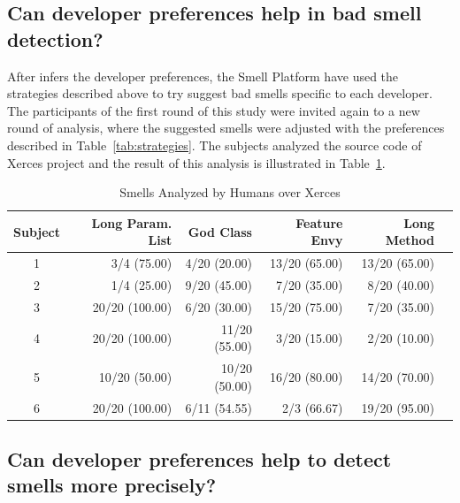 \documentclass[conference]{IEEEtran}
\begin{document}
\subsection{Can developer preferences help in bad smell detection?}

After infers the developer preferences, the Smell Platform have used the strategies described above to try suggest bad smells specific to each developer. The participants of the first round of this study were invited again to a new round of analysis, where the suggested smells were adjusted with the preferences described in Table~\ref{tab:strategies}. The subjects analyzed the source code of Xerces project and the result of this analysis is illustrated in Table~\ref{tab:turn2}.

\begin{table}[h]
\centering
\caption{Smells Analyzed by Humans over Xerces}
\label{tab:turn2}
\begin{tabular}{crrrrr}
\hline
Subject & \multicolumn{1}{r}{Long Param. List}       & \multicolumn{1}{r}{God Class}          & \multicolumn{1}{r}{Feature Envy}           & \multicolumn{1}{r}{Long Method}  \\ \hline
1   & \multicolumn{1}{r}{3/4 (75.00)} & \multicolumn{1}{r}{4/20 (20.00)} & \multicolumn{1}{r}{13/20 (65.00)} & 13/20 (65.00)                \\ 
2        & 1/4 (25.00)            & 9/20 (45.00)                      & 7/20 (35.00)                       & 8/20 (40.00)             \\ 
3        & 20/20 (100.00)         & 6/20 (30.00)                      & 15/20 (75.00)                      & 7/20 (35.00)             \\ 
4        & 20/20 (100.00)           & 11/20 (55.00)                      & 3/20 (15.00)                       & 2/20 (10.00)             \\ 
5        & 10/20 (50.00)           & 10/20 (50.00)                      & 16/20 (80.00)                       & 14/20 (70.00)             \\ 
6        & 20/20 (100.00)           & 6/11 (54.55)                     & 2/3 (66.67)                      & 19/20 (95.00)             \\ \hline
\end{tabular}
\end{table}


\subsection{Can developer preferences help to detect smells more precisely?}
\end{document}
